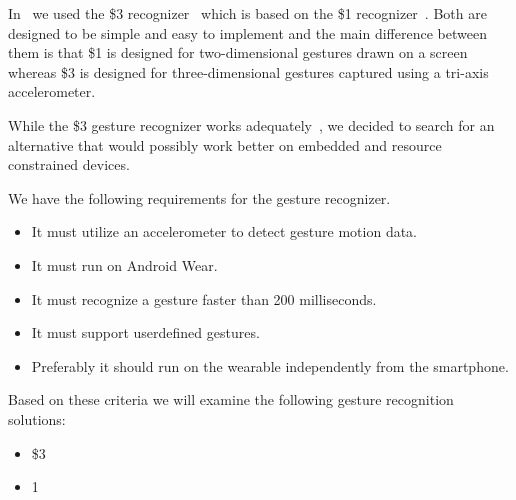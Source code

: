 In~\cite{prespecialisation} we used the \$3 recognizer~\cite{threedollar} which is based on the \$1 recognizer~\cite{wobbrock2007gestures}.
Both are designed to be simple and easy to implement and the main difference between them is that \$1 is designed for two-dimensional gestures drawn on a screen whereas \$3 is designed for three-dimensional gestures captured using a tri-axis accelerometer.

While the \$3 gesture recognizer works adequately~\cite[p. 55]{prespecialisation}, we decided to search for an alternative that would possibly work better on embedded and resource constrained devices.

We have the following requirements for the gesture recognizer.

\begin{itemize}
    \item It must utilize an accelerometer to detect gesture motion data.
    \item It must run on Android Wear.
    \item It must recognize a gesture faster than 200 milliseconds.
    \item It must support userdefined gestures.
    \item Preferably it should run on the wearable independently from the smartphone.
\end{itemize}

Based on these criteria we will examine the following gesture recognition solutions:

\begin{itemize}
    \item \$3~\cite{threedollar}
    \item 1\textcent~\cite{herold20121}
\end{itemize}



